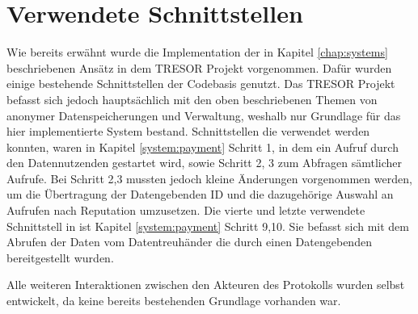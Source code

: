 \documentclass[
	fontsize=12pt,
	headings=small,
	parskip=half,           %
	bibliography=totoc,
	numbers=noenddot,       %
	open=any,               %
]{scrreprt}
\begin{document}
\section{Verwendete Schnittstellen}
Wie bereits erwähnt wurde die Implementation der in Kapitel \ref{chap:systems} beschriebenen Ansätz in dem TRESOR Projekt vorgenommen. Dafür wurden einige bestehende Schnittstellen der Codebasis genutzt. Das TRESOR Projekt befasst sich jedoch hauptsächlich mit den oben beschriebenen Themen von anonymer Datenspeicherungen und Verwaltung, weshalb nur Grundlage für das hier implementierte System bestand. Schnittstellen die verwendet werden konnten, waren in Kapitel \ref{system:payment} Schritt 1, in dem ein Aufruf durch den Datennutzenden gestartet wird, sowie Schritt 2, 3 zum Abfragen sämtlicher Aufrufe. Bei Schritt 2,3 mussten jedoch kleine Änderungen vorgenommen werden, um die Übertragung der Datengebenden ID und die dazugehörige Auswahl an Aufrufen nach Reputation umzusetzen. Die vierte und letzte verwendete Schnittstell in ist Kapitel \ref{system:payment} Schritt 9,10. Sie befasst sich mit dem Abrufen der Daten vom Datentreuhänder die durch einen Datengebenden bereitgestellt wurden.

Alle weiteren Interaktionen zwischen den Akteuren des Protokolls wurden selbst entwickelt, da keine bereits bestehenden Grundlage vorhanden war. 
\end{document}
